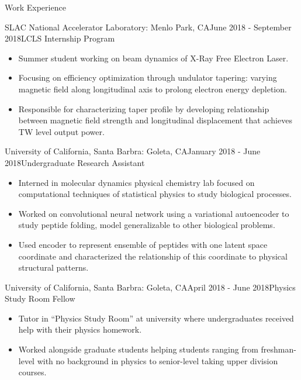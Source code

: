 \documentclass{resume} %
\begin{document}

\begin{rSection}{Work Experience}

\begin{rSubsection}{SLAC National Accelerator Laboratory: Menlo Park, CA}{June 2018 - September 2018}{LCLS Internship Program}{}
\begin{itemize}
    \item Summer student working on beam dynamics of X-Ray Free Electron Laser.
    \item Focusing on efficiency optimization through undulator tapering: varying magnetic field along longitudinal axis to prolong electron energy depletion.
    \item Responsible for characterizing taper profile by developing relationship between magnetic field strength and longitudinal displacement that achieves TW level output power.
\end{itemize}
\end{rSubsection}

\begin{rSubsection}{University of California, Santa Barbra: Goleta, CA}{January 2018 - June 2018}{Undergraduate Research Assistant}{}
\begin{itemize}
    \item Interned in molecular dynamics physical chemistry lab focused on computational techniques of statistical physics to study biological processes.
    \item Worked on convolutional neural network using a variational autoencoder to study peptide folding, model generalizable to other biological problems.
    \item Used encoder to represent ensemble of peptides with one latent space coordinate and characterized the relationship of this coordinate to physical structural patterns.
\end{itemize}
\end{rSubsection}

\begin{rSubsection}{University of California, Santa Barbra: Goleta, CA}{April 2018 - June 2018}{Physics Study Room Fellow}{}
\begin{itemize}
    \item Tutor in “Physics Study Room” at university where undergraduates received help with their physics homework.
    \item Worked alongside graduate students helping students ranging from freshman-level with no background in physics to senior-level taking upper division courses.
\end{itemize}
\end{rSubsection}


\end{rSection}
\end{document}
